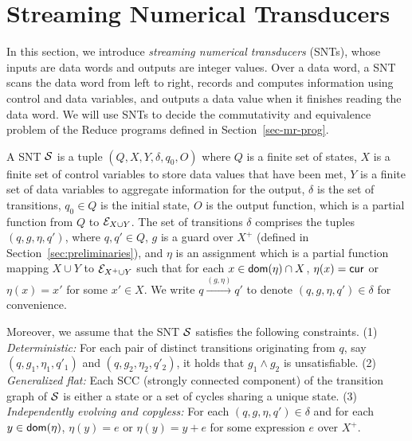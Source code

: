


\section{Streaming Numerical Transducers}\label{sec:def-snt}

In this section, we introduce \emph{streaming numerical transducers} (SNTs), whose inputs are data words and outputs are integer values. Over a data word, a SNT scans the data word from left to right, records and computes information using control and data variables, and outputs a data value when it finishes reading the data word. We will use SNTs to decide the commutativity and equivalence problem of the Reduce programs defined in Section~\ref{sec-mr-prog}.


A SNT ${\mathcal{S} }$ is a tuple $(Q, X, Y, \delta, q_0, O)$ where $Q$ is a finite set of states, $X$ is a finite set of control variables to store data values that have been met, $Y$ is a finite set of data variables to aggregate information for the output, $\delta$ is the set of transitions, $q_0 \in Q$ is the initial state, $O$ is the output function, which is a partial function from $Q$ to ${\mathcal{E} }_{X \cup Y}$.%
The set of transitions $\delta$ comprises the tuples $(q,  g, \eta, q')$, where $q,q'\in Q$, $g$ is a guard over $X^+$ (defined in Section~\ref{sec:preliminaries}), and $\eta$ is an assignment which is a partial function mapping $X \cup Y$  to ${\mathcal{E} }_{X^+ \cup Y}$ such that for each $x \in \mathsf{dom}(\eta) \cap X$, $\eta(x)=\mathsf{cur}$ or $\eta(x) = x'$ for some $x' \in X$. We write $q \xrightarrow{(g,\eta)} q'$ to denote $(q,g,\eta,q') \in \delta$ for convenience. 

Moreover, we assume that the SNT ${\mathcal{S} }$ satisfies the following constraints. (1) \emph{Deterministic:} For each pair of distinct transitions originating from $q$, say $(q, g_1, \eta_1,q'_1)$ and $(q, g_2,\eta_2,q'_2)$, it holds that $g_1 \wedge g_2$ is unsatisfiable. (2) \emph{Generalized flat:} Each SCC (strongly connected component) of the transition graph of ${\mathcal{S} }$ is either a state or a set of cycles sharing a unique state. (3) \emph{Independently evolving and copyless:} For each $(q, g, \eta, q') \in \delta$ and for each $y \in \mathsf{dom}(\eta)$, $\eta(y)=e$ or $\eta(y)=y+e$ for some expression $e$ over $X^+$.

